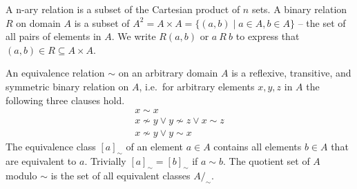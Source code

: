 \begin{definition}
	A n-ary relation is a subset of the Cartesian product of $n$ sets.
	A {\myem binary relation} $R$ on domain $A$ 
	is a subset of $A^2 = A \times A = \{ (a,b) \mid a\in A, b\in A \}$ -- 
	the set of all pairs of elements in $A$.
	We write $R(a,b)$ or $a\ R\ b$ to express that $(a,b)\in R \subseteq A\times A$.
\end{definition}
\begin{definition}
	An {\myem equivalence relation} $\sim$ on an arbitrary domain $A$ 
	is a reflexive, transitive, and symmetric binary relation on $A$, 
	i.e.~for arbitrary elements $x,y,z$ in $A$ the following three clauses hold.
	\begin{align*}
	x\sim x
	\tag*{reflexivivity}
	\\
	x\not\sim y \lor  y \not\sim z \lor x\sim z
	\tag*{transitivity}
	\\
	x\not\sim y \lor y\sim x
	\tag*{symmetry}
	\end{align*}
	The {\myem equivalence class} $[a]_\sim$ of an element $a\in A$ contains all elements $b\in A$ that are equivalent to $a$.
	Trivially $[a]_\sim = [b]_\sim$ if $a\sim b$.
	The quotient set of $A$ modulo $\sim$ is the set of all equivalent classes $A/_\sim$. 
\end{definition}